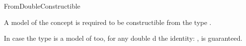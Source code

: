 \begin{ccRefConcept}{FromDoubleConstructible}

\ccDefinition
  

A model of the concept  is required 
to be constructible from the type .  

In case the type is a model of  too, for any double d
the identity: , is guaranteed.  



\ccCreation
{}  %




\end{ccRefConcept}
